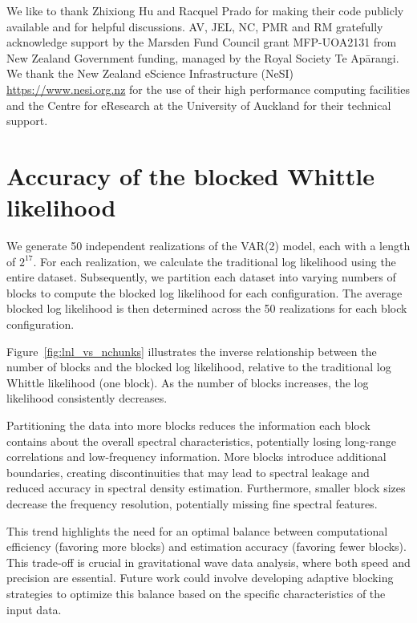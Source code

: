 \documentclass[%
 reprint,
 amsmath,amssymb,
 aps,
 nofootinbib,
]{revtex4-2}
\begin{document}
\begin{acknowledgments}
We like to thank Zhixiong Hu and Racquel Prado for making their code publicly available and for helpful discussions. AV,  JEL, NC, PMR and RM gratefully acknowledge support  by the Marsden Fund Council grant MFP-UOA2131 from New Zealand Government funding, managed by the Royal Society Te Apārangi. We thank the New Zealand eScience Infrastructure
(NeSI) \url{https://www.nesi.org.nz} for the use of their high performance computing facilities and
the Centre for eResearch at the University of Auckland for their technical
support.
\end{acknowledgments}


\appendix  


\section{Accuracy of the blocked  Whittle likelihood}
\label{appdx:blocked_lnl}

We generate 50 independent realizations of the VAR(2) model, each with a length of \(2^{17}\). 
For each realization, we calculate the traditional log likelihood using the entire dataset. 
Subsequently, we partition each dataset into varying numbers of blocks to compute the blocked log likelihood for each configuration. 
The average blocked log likelihood is then determined across the 50 realizations for each block configuration.

Figure~\ref{fig:lnl_vs_nchunks} illustrates the inverse relationship between the number of blocks and the blocked log likelihood, relative to the traditional log Whittle likelihood (one block). 
As the number of blocks increases, the log likelihood consistently decreases.

Partitioning the data into more blocks reduces the information each block contains about the overall spectral characteristics, potentially losing long-range correlations and low-frequency information. More blocks introduce additional boundaries, creating discontinuities that may lead to spectral leakage and reduced accuracy in spectral density estimation. Furthermore, smaller block sizes decrease the frequency resolution, potentially missing fine spectral features.

This trend highlights the need for an optimal balance between computational efficiency (favoring more blocks) and estimation accuracy (favoring fewer blocks). This trade-off is crucial in gravitational wave data analysis, where both speed and precision are essential. Future work could involve developing adaptive blocking strategies to optimize this balance based on the specific characteristics of the input data.
\end{document}
